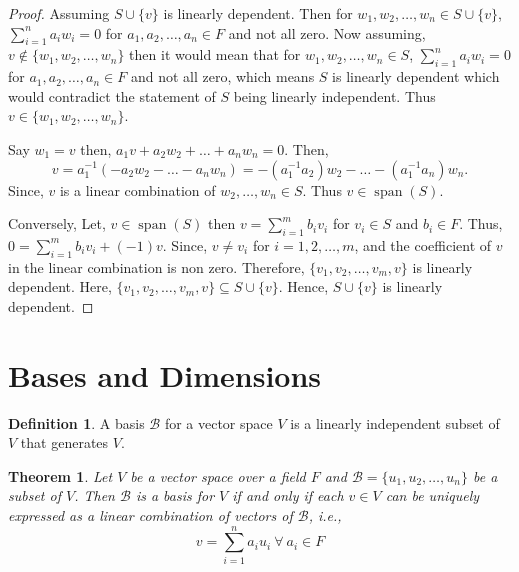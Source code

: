 \documentclass[12pt, a4paper]{article}
\newtheorem{theorem}{Theorem}[section]
\theoremstyle{definition}
\newtheorem{definition}{Definition}[section]
\theoremstyle{remark}
\newcommand{\B}{\mathscr{B}}
\DeclareMathOperator{\Span}{span}
\begin{document}
\begin{proof}
    Assuming $S \cup \{v\}$ is linearly dependent. Then for $w_1, w_2, \dots, w_n \in S \cup \{v\}$, $\displaystyle\sum_{i=1}^{n} a_i w_i = 0$ for $a_1, a_2, \dots, a_n \in F$ and not all zero. Now assuming, $v \notin \{w_1, w_2, \dots, w_n\}$ then it would mean that for $w_1, w_2, \dots, w_n \in S$, $\displaystyle\sum_{i=1}^{n} a_i w_i = 0$ for $a_1, a_2, \dots, a_n \in F$ and not all zero, which means $S$ is linearly dependent which would contradict the statement of $S$ being linearly independent. Thus $v \in \{w_1, w_2, \dots, w_n\}$.

Say $w_1 = v$ then, $a_1 v + a_2 w_2 + \dots + a_n w_n = 0$. Then, $$v = a_1^{-1}(-a_2 w_2 - \dots - a_n w_n) = -(a_1^{-1}a_2)w_2 - \dots - (a_1^{-1}a_n)w_n.$$
Since, $v$ is a linear combination of $w_2, \dots, w_n \in S$. Thus $v \in \Span(S)$.

Conversely, Let, $v \in \Span(S)$ then $v = \displaystyle\sum_{i=1}^{m} b_i v_i$ for $v_i \in S$ and $b_i \in F$.
Thus, $0 = \displaystyle\sum_{i=1}^{m} b_i v_i + (-1)v$. Since, $v \neq v_i$ for $i = 1, 2, \dots, m$, and the coefficient of $v$ in the linear combination is non zero. Therefore, $\{v_1, v_2, \dots, v_m, v\}$ is linearly dependent. Here, $\{v_1, v_2, \dots, v_m, v\} \subseteq S \cup \{v\}$. Hence, $S \cup \{v\}$ is linearly dependent.
\end{proof}

\section{Bases and Dimensions}
\begin{definition}
    A basis $\B$ for a vector space $V$ is a linearly independent subset of $V$ that generates $V$.
\end{definition}

\begin{theorem}
    Let $V$ be a vector space over a field $F$ and $\B = \{u_1, u_2, \ldots, u_n\}$ be a subset of $V$. Then $\B$ is a basis for $V$ if and only if each $v \in V$ can be uniquely expressed as a linear combination of vectors of $\B$, \textit{i.e.},
    \[
    v = \sum_{i = 1}^{n}a_iu_i \ \forall \ a_i \in F
    \]
\end{theorem}
\end{document}
